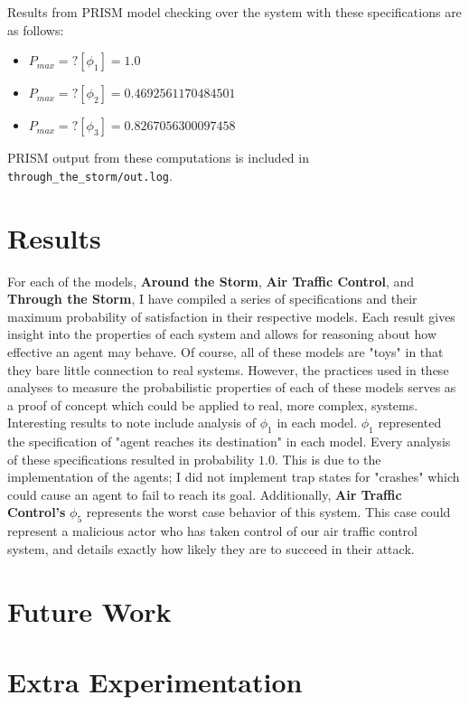 \documentclass{article}
\begin{document}
Results from PRISM model checking over the system with these specifications are as follows:
\begin{itemize}
    \item $P_{max}=?[\phi_1] = 1.0$
    \item $P_{max}=?[\phi_2] = 0.4692561170484501$
    \item $P_{max}=?[\phi_3] = 0.8267056300097458$
\end{itemize}

PRISM output from these computations is included in \texttt{through\_the\_storm/out.log}.

\section{Results}

For each of the models, \textbf{Around the Storm}, \textbf{Air Traffic Control}, and \textbf{Through the Storm}, I have compiled a series of specifications and their maximum probability of satisfaction in their respective models. Each result gives insight into the properties of each system and allows for reasoning about how effective an agent may behave. Of course, all of these models are "toys" in that they bare little connection to real systems.  However, the practices used in these analyses to measure the probabilistic properties of each of these models serves as a proof of concept which could be applied to real, more complex, systems. \\

Interesting results to note include analysis of $\phi_1$ in each model. $\phi_1$ represented the specification of "agent reaches its destination" in each model. Every analysis of these specifications resulted in probability $1.0$. This is due to the implementation of the agents; I did not implement trap states for "crashes" which could cause an agent to fail to reach its goal. Additionally, \textbf{Air Traffic Control's} $\phi_5$ represents the worst case behavior of this system. This case could represent a malicious actor who has taken control of our air traffic control system, and details exactly how likely they are to succeed in their attack.

\section{Future Work}

\section{Extra Experimentation}
\end{document}
